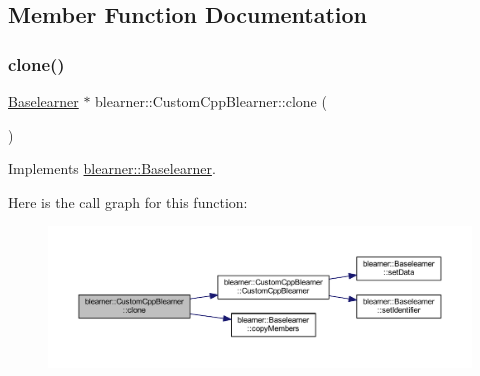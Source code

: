 \subsection{Member Function Documentation}
\mbox{\label{classblearner_1_1_custom_cpp_blearner_a8b76705131d397974cd208fdcfd70496}} 
\subsubsection{\texorpdfstring{clone()}{clone()}}
{\footnotesize\ttfamily \mbox{\hyperlink{classblearner_1_1_baselearner}{Baselearner}} $\ast$ blearner\+::\+Custom\+Cpp\+Blearner\+::clone (\begin{DoxyParamCaption}{ }\end{DoxyParamCaption})\hspace{0.3cm}{\ttfamily [virtual]}}



Implements \mbox{\hyperlink{classblearner_1_1_baselearner_a8e12c6739f085917a7d2da6570c51a21}{blearner\+::\+Baselearner}}.

Here is the call graph for this function\+:
\nopagebreak
\begin{figure}[H]
\begin{center}
\leavevmode
\includegraphics[width=350pt]{classblearner_1_1_custom_cpp_blearner_a8b76705131d397974cd208fdcfd70496_cgraph}
\end{center}
\end{figure}
\mbox{\label{classblearner_1_1_custom_cpp_blearner_a14607a1d1f312d46a3024b37085c146d}} 
